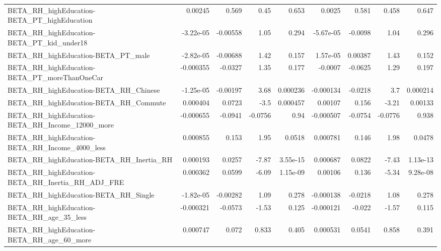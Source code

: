 \begin{tabular}{lrrrrrrrr}
BETA\_RH\_highEducation-BETA\_PT\_highEducation        &     0.00245 &        0.569 &     0.45 &    0.653 &     0.0025 &       0.581 &        0.458 &         0.647 \\
BETA\_RH\_highEducation-BETA\_PT\_kid\_under18          &   -3.22e-05 &     -0.00558 &     1.05 &    0.294 &  -5.67e-05 &     -0.0098 &         1.04 &         0.296 \\
BETA\_RH\_highEducation-BETA\_PT\_male                 &   -2.82e-05 &     -0.00688 &     1.42 &    0.157 &   1.57e-05 &     0.00387 &         1.43 &         0.152 \\
BETA\_RH\_highEducation-BETA\_PT\_moreThanOneCar       &   -0.000355 &      -0.0327 &     1.35 &    0.177 &    -0.0007 &     -0.0625 &         1.29 &         0.197 \\
BETA\_RH\_highEducation-BETA\_RH\_Chinese              &   -1.25e-05 &     -0.00197 &     3.68 & 0.000236 &  -0.000134 &     -0.0218 &          3.7 &      0.000214 \\
BETA\_RH\_highEducation-BETA\_RH\_Commute              &    0.000404 &       0.0723 &     -3.5 & 0.000457 &    0.00107 &       0.156 &        -3.21 &       0.00133 \\
BETA\_RH\_highEducation-BETA\_RH\_Income\_12000\_more    &   -0.000655 &      -0.0941 &  -0.0756 &     0.94 &  -0.000507 &     -0.0754 &      -0.0776 &         0.938 \\
BETA\_RH\_highEducation-BETA\_RH\_Income\_4000\_less     &    0.000855 &        0.153 &     1.95 &   0.0518 &   0.000781 &       0.146 &         1.98 &        0.0478 \\
BETA\_RH\_highEducation-BETA\_RH\_Inertia\_RH           &    0.000193 &       0.0257 &    -7.87 & 3.55e-15 &   0.000687 &      0.0822 &        -7.43 &      1.13e-13 \\
BETA\_RH\_highEducation-BETA\_RH\_Inertia\_RH\_ADJ\_FRE   &    0.000362 &       0.0599 &    -6.09 & 1.15e-09 &    0.00106 &       0.136 &        -5.34 &      9.28e-08 \\
BETA\_RH\_highEducation-BETA\_RH\_Single               &   -1.82e-05 &     -0.00282 &     1.09 &    0.278 &  -0.000138 &     -0.0218 &         1.08 &         0.278 \\
BETA\_RH\_highEducation-BETA\_RH\_age\_35\_less          &   -0.000321 &      -0.0573 &    -1.53 &    0.125 &  -0.000121 &      -0.022 &        -1.57 &         0.115 \\
BETA\_RH\_highEducation-BETA\_RH\_age\_60\_more          &    0.000747 &        0.072 &    0.833 &    0.405 &   0.000531 &      0.0541 &        0.858 &         0.391 \\

\end{tabular}
